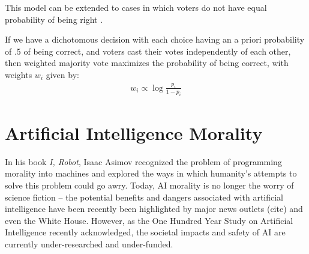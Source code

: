 This model can be extended to cases in which voters do not have equal probability of being right \cite{Nitzan1982, Shapley1984}.

\begin{theorem}
 If we have a dichotomous decision with each choice having an a priori probability of .5 of being correct, and voters cast their votes independently of each other, then weighted majority vote maximizes the probability of being correct, with weights $w_i$ given by:
 \begin{align*}
 w_i \propto \log \frac{p_i}{1 - p_i}
 \end{align*}
\end{theorem}

\section{Artificial Intelligence Morality}
In his book \textit{I, Robot}, Isaac Asimov recognized the problem of programming morality into machines and explored the ways in which humanity's attempts to solve this problem could go awry\cite{asimov}. Today, AI morality is no longer the worry of science fiction -- the potential benefits and dangers associated with artificial intelligence have been recently been highlighted by major news outlets (cite) and even the White House\cite{whiteHouseReport, obamaInterview}.  However, as the One Hundred Year Study on Artificial Intelligence recently acknowledged, the societal impacts and safety of AI are currently under-researched and under-funded\cite{ai100}. 
